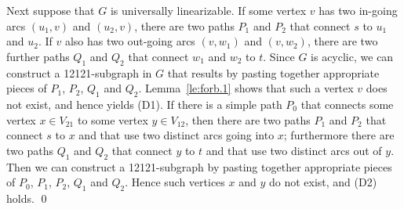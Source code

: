 \documentclass[11pt,fleqn]{article}
\begin{document}
Next suppose that $G$ is universally linearizable.
If some vertex $v$ has two in-going arcs $(u_1,v)$ and $(u_2,v)$, there are two 
paths $P_1$ and $P_2$ that connect $s$ to $u_1$ and $u_2$.
If $v$ also has two out-going arcs $(v,w_1)$ and $(v,w_2)$, there are two further
paths $Q_1$ and $Q_2$ that connect $w_1$ and $w_2$ to $t$.
Since $G$ is acyclic, we can construct a 12121-subgraph in $G$ that results by pasting together 
appropriate pieces of $P_1$, $P_2$, $Q_1$ and $Q_2$.
Lemma~\ref{le:forb.1} shows that such a vertex $v$ does not exist, and hence yields (D1).
If there is a simple path $P_0$ that connects some vertex $x\in V_{21}$ to some vertex $y\in V_{12}$,
then there are two paths $P_1$ and $P_2$ that connect $s$ to $x$ and that use two distinct 
arcs going into $x$; furthermore there are two paths $Q_1$ and $Q_2$ that connect $y$ to $t$ and 
that use two distinct arcs out of $y$.
Then we can construct a 12121-subgraph by pasting together appropriate pieces of 
$P_0$, $P_1$, $P_2$, $Q_1$ and $Q_2$.
Hence such vertices $x$ and $y$ do not exist, and (D2) holds.
\qed
\end{document}

